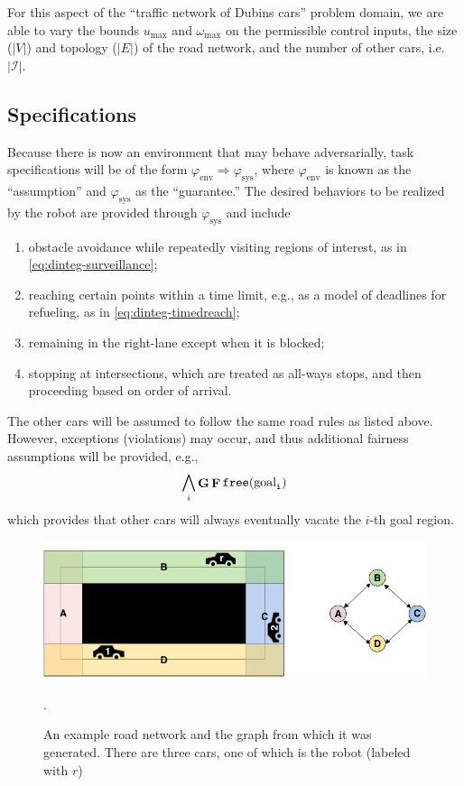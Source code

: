 \documentclass[12pt]{amsart}
\DeclareMathOperator{\Galways}{\mathbf{G}}
\DeclareMathOperator{\Feventually}{\mathbf{F}}
\theoremstyle{definition}
\begin{document}
For this aspect of the ``traffic network of Dubins cars'' problem domain, we are
able to vary the bounds $u_{\mathrm{max}}$ and $\omega_{\mathrm{max}}$ on the
permissible control inputs, the size ($|V|$) and topology ($|E|$) of the road network, and the
number of other cars, i.e. $|\mathcal I|$.


\subsection{Specifications}

Because there is now an environment that may behave adversarially, task
specifications will be of the form $\varphi_{\mathrm{env}} \Rightarrow
\varphi_{\mathrm{sys}}$, where $\varphi_{\mathrm{env}}$ is known as the
``assumption'' and $\varphi_{\mathrm{sys}}$ as the ``guarantee.''  The desired
behaviors to be realized by the robot are provided through
$\varphi_{\mathrm{sys}}$ and include
\begin{enumerate}
\item obstacle avoidance while repeatedly visiting regions of interest, as in
  \eqref{eq:dinteg-surveillance};

\item reaching certain points within a time limit, e.g., as a model of deadlines
  for refueling, as in \eqref{eq:dinteg-timedreach};

\item remaining in the right-lane except when it is blocked;

\item stopping at intersections, which are treated as all-ways stops, and then
  proceeding based on order of arrival.
\end{enumerate}
The other cars will be assumed to follow the same road rules as listed above.
However, exceptions (violations) may occur, and thus additional fairness
assumptions will be provided, e.g.,
\begin{equation*}\label{eq:freegoals}
\bigwedge_i \Galways \Feventually \tt{free}(\mathrm{goal}_i)
\end{equation*}
which provides that other cars will always eventually vacate the $i$-th goal
region.

\begin{figure}[h!]\label{fig:network}
  \centering
        \includegraphics[width=1.0\textwidth]{images/network}
  \caption{An example road network and the graph from which it was generated. There are three cars, one of which is the robot (labeled with $r$)}.
\end{figure}
\end{document}
